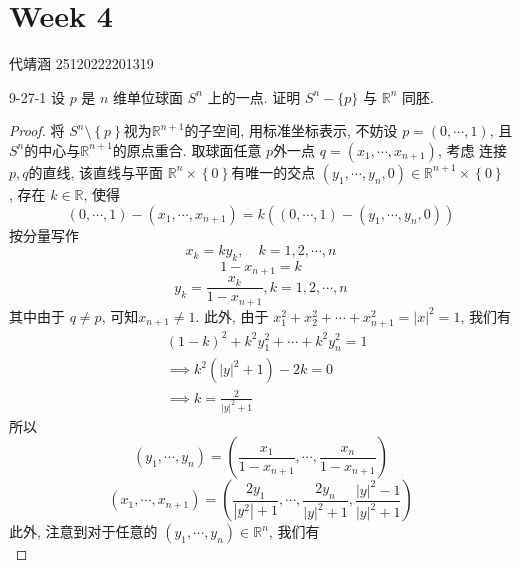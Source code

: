 \documentclass[../main.tex]{subfiles}
\begin{document}
\ifSubfilesClassLoaded{

    
    \setcounter{chapter}{3}
}{}

\chapter{ Week 4 }
代靖涵 25120222201319

\begin{exercise}{}{9-27-1}
设 $p$ 是 $n$ 维单位球面 $S^n$ 上的一点. 证明 $S^n - \{p\}$ 与 $\mathbb{R}^n$ 同胚.
\end{exercise}

\begin{proof}
    将 \(  S^{n}\setminus \left\{ p \right\}  \)视为\(  \mathbb{R} ^{n+ 1}  \)的子空间, 用标准坐标表示, 不妨设 \(  p= \left( 0,\cdots ,1 \right)   \), 且 \(  S^{n}  \)的中心与\(  \mathbb{R} ^{n+ 1}  \)的原点重合.    取球面任意 \(  p  \)外一点 \(  q = \left( x_1,\cdots ,x_{n+ 1} \right)  \), 考虑 连接 \(  p,q  \)的直线,   该直线与平面 \(  \mathbb{R} ^{n}\times \left\{ 0 \right\}\)有唯一的交点 \(  \left( y_1,\cdots ,y_{n} ,0\right)\in  \mathbb{R} ^{n+ 1}\times \left\{ 0 \right\}   \) ,   存在 \(  k \in \mathbb{R}   \), 使得   \[
    \left( 0,\cdots ,1 \right)-\left( x_1,\cdots ,x_{n+ 1} \right) = k \left( \left( 0,\cdots ,1 \right) -\left( y_1,\cdots ,y_{n} ,0\right)  \right)  
    \]按分量写作 \[
   x_{k}= ky_{k},\quad k= 1,2,\cdots ,n
    \] \[
    1-x_{n+ 1}= k
    \] \[
    y_{k}= \frac{x_{k} }{1-x_{n+ 1} }, k= 1,2,\cdots ,n 
    \] 其中由于 \(  q\neq p  \), 可知\(  x_{n+ 1}\neq 1  \).  此外, 由于 \(  x_1^{2}+ x_2^{2}+ \cdots + x_{n+ 1}^{2}= \left| x \right|^{2}= 1   \), 我们有 \[
    \begin{aligned}
    & \left( 1-k \right)^{2}+ k^{2}y_1^{2}+ \cdots + k^{2}y_{n}^{2}= 1 \\ 
     &\implies k^{2}\left( \left| y \right|^{2}+ 1  \right)-2k = 0 \\ 
      &\implies k= \frac{2 }{\left| y \right|^{2}+ 1  } 
    \end{aligned}
    \]  所以 \[
    \left( y_1,\cdots ,y_{n} \right)= \left( \frac{x_1 }{1-x_{n+ 1} },\cdots ,\frac{x_{n} }{1-x_{n+ 1} }   \right)  
    \] \[
    \left( x_1,\cdots ,x_{n+ 1} \right)= \left( \frac{2y_1 }{\left| y^{2} \right|+ 1  }  ,\cdots ,\frac{2y_{n} }{\left| y \right|^{2}+ 1  }, \frac{\left| y \right|^{2} -1 }{\left| y \right|^{2}+ 1  }  \right)  
    \]此外, 注意到对于任意的 \(  \left( y_1,\cdots ,y_{n} \right)\in \mathbb{R} ^{n}   \), 我们有 \[
\]
\end{proof}
\end{document}
